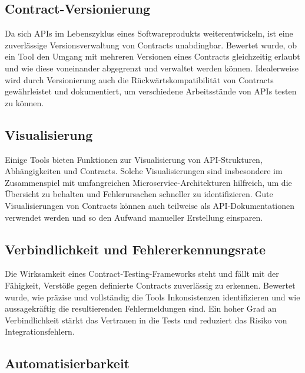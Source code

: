 \subsection{Contract-Versionierung}\label{subsec:frameworks_criterion_versioning}

Da sich \glspl{API} im Lebenszyklus eines Softwareprodukts weiterentwickeln, ist eine zuverlässige Versionsverwaltung von Contracts unabdingbar.
Bewertet wurde, ob ein Tool den Umgang mit mehreren Versionen eines Contracts gleichzeitig erlaubt und wie diese voneinander abgegrenzt und verwaltet werden können.
Idealerweise wird durch Versionierung auch die Rückwärtskompatibilität von Contracts gewährleistet und dokumentiert, um verschiedene Arbeitsstände von \glspl{API} testen zu können.

\subsection{Visualisierung}\label{subsec:frameworks_criterion_visualization}

Einige Tools bieten Funktionen zur Visualisierung von \gls{API}-Strukturen, Abhängigkeiten und Contracts.
Solche Visualisierungen sind insbesondere im Zusammenspiel mit umfangreichen Microservice-Architekturen hilfreich, um die Übersicht zu behalten und Fehlerursachen schneller zu identifizieren.
Gute Visualisierungen von Contracts können auch teilweise als \gls{API}-Dokumentationen verwendet werden und so den Aufwand manueller Erstellung einsparen.

\subsection{Verbindlichkeit und Fehlererkennungsrate}\label{subsec:frameworks_criterion_reliability}

Die Wirksamkeit eines Contract-Testing-Frameworks steht und fällt mit der Fähigkeit, Verstöße gegen definierte Contracts zuverlässig zu erkennen.
Bewertet wurde, wie präzise und vollständig die Tools Inkonsistenzen identifizieren und wie aussagekräftig die resultierenden Fehlermeldungen sind.
Ein hoher Grad an Verbindlichkeit stärkt das Vertrauen in die Tests und reduziert das Risiko von Integrationsfehlern.

\subsection{Automatisierbarkeit}\label{subsec:frameworks_criterion_automability}

